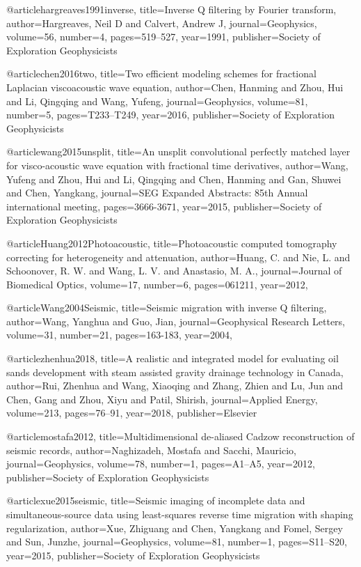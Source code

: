 {@article{hargreaves1991inverse,
  title={Inverse {Q} filtering by {F}ourier transform},
  author={Hargreaves, Neil D and Calvert, Andrew J},
  journal={Geophysics},
  volume={56},
  number={4},
  pages={519--527},
  year={1991},
  publisher={Society of Exploration Geophysicists}
}

@article{chen2016two,
  title={Two efficient modeling schemes for fractional {L}aplacian viscoacoustic wave equation},
  author={Chen, Hanming and Zhou, Hui and Li, Qingqing and Wang, Yufeng},
  journal={Geophysics},
  volume={81},
  number={5},
  pages={T233--T249},
  year={2016},
  publisher={Society of Exploration Geophysicists}
}

@article{wang2015unsplit,
  title={An unsplit convolutional perfectly matched layer for visco-acoustic wave equation with fractional time derivatives},
  author={Wang, Yufeng and Zhou, Hui and Li, Qingqing and Chen, Hanming and Gan, Shuwei and Chen, Yangkang},
  journal={SEG Expanded Abstracts: 85th Annual international meeting},
  pages={3666-3671},
  year={2015},
  publisher={Society of Exploration Geophysicists}
}

@article{Huang2012Photoacoustic,
  title={Photoacoustic computed tomography correcting for heterogeneity and attenuation},
  author={Huang, C. and Nie, L. and Schoonover, R. W. and Wang, L. V. and Anastasio, M. A.},
  journal={Journal of Biomedical Optics},
  volume={17},
  number={6},
  pages={061211},
  year={2012},
}

@article{Wang2004Seismic,
  title={Seismic migration with inverse {Q} filtering},
  author={Wang, Yanghua and Guo, Jian},
  journal={Geophysical Research Letters},
  volume={31},
  number={21},
  pages={163-183},
  year={2004},
}

@article{zhenhua2018,
  title={A realistic and integrated model for evaluating oil sands development with steam assisted gravity drainage technology in Canada},
  author={Rui, Zhenhua and Wang, Xiaoqing and Zhang, Zhien and Lu, Jun and Chen, Gang and Zhou, Xiyu and Patil, Shirish},
  journal={Applied Energy},
  volume={213},
  pages={76--91},
  year={2018},
  publisher={Elsevier}
}

@article{mostafa2012,
  title={Multidimensional de-aliased Cadzow reconstruction of seismic records},
  author={Naghizadeh, Mostafa and Sacchi, Mauricio},
  journal={Geophysics},
  volume={78},
  number={1},
  pages={A1--A5},
  year={2012},
  publisher={Society of Exploration Geophysicists}
}

@article{xue2015seismic,
  title={Seismic imaging of incomplete data and simultaneous-source data using least-squares reverse time migration with shaping regularization},
  author={Xue, Zhiguang and Chen, Yangkang and Fomel, Sergey and Sun, Junzhe},
  journal={Geophysics},
  volume={81},
  number={1},
  pages={S11--S20},
  year={2015},
  publisher={Society of Exploration Geophysicists}
}

}
